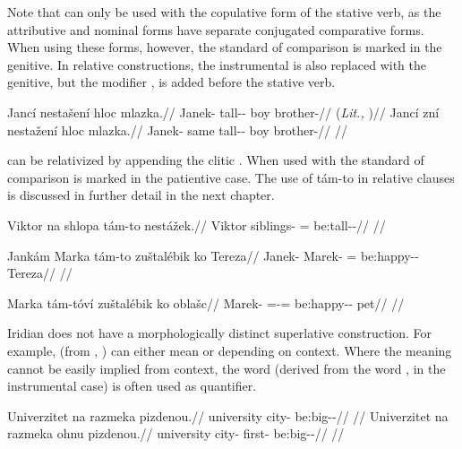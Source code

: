 Note that  can only be used with the copulative form of the stative verb, as the attributive and nominal forms have separate conjugated comparative forms. When using these forms, however, the standard of comparison is marked in the genitive. In relative constructions, the instrumental is also replaced with the genitive, but the modifier ,  is added before the stative verb.

\pex
\a
\begingl
\gla Jancí nestašení hloc mlazka.//
\glb Janek-\Gen{} tall-\Comp{}-\Att{} boy brother-\Dim{}//
\glft {} (\emph{Lit.,} )//
\endgl
\a
\begingl
\gla Jancí zní nestažení hloc mlazka.//
\glb Janek-\Gen{} same tall-\Comp{}-\Att{} boy brother-\Dim{}//
\glft {}//
\endgl
\xe

 can be relativized by appending the clitic . When used with  the standard of comparison is marked in the patientive case. The use of tám-to in relative clauses is discussed in further detail in the next chapter.

\ex
\begingl
\gla Viktor na shlopa tám-to nestážek.//
\glb Viktor \Loc{} siblings-\Acc{} \Comp{}=\Rz{} be:tall-\Av{}-\Pf{}//
\glft {}//
\endgl
\xe

\ex
\begingl
\gla Jankám Marka tám-to zuštalébik ko Tereza//
\glb Janek-\Agt{} Marek-\Acc{} \Comp{}=\Rz{} be:happy-\Ben{}-\Pf{} \Lnk{} Tereza//
\glft {}//
\endgl
\xe

\ex
\begingl
\gla Marka tám-tóví zuštalébik ko oblašc//
\glb Marek-\Acc{} \Comp{}=\Rz{}-\Gen{}= be:happy-\Ben{}-\Pf{} \Lnk{} pet//
\glft {}//
\endgl
\xe

Iridian does not have a morphologically distinct superlative construction. For example,  (from , ) can either mean  or  depending on context. Where the meaning cannot be easily implied from context, the word  (derived from the word ,  in the instrumental case) is often used as quantifier.

\pex
\a
\begingl
\gla Univerzitet na razmeka pizdenou.//
\glb university \Loc{} city-\Acc{} be:big-\Comp{}-\Nz{}//
\glft {}//
\endgl
\a
\begingl
\gla Univerzitet na razmeka ohnu pizdenou.//
\glb university \Loc{} city-\Acc{} first-\Ins{} be:big-\Comp{}-\Nz{}//
\glft {}//
\endgl
\xe

